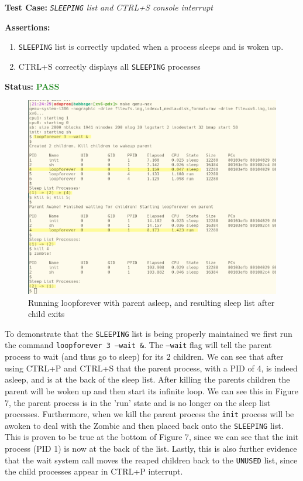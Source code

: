 \documentclass[11pt,letterpaper]{report}
\newcommand{\code}[1]{\colorbox{codegray}{\texttt{#1}}}
\begin{document}
{  \noindent\textbf{Test Case:} \emph{\code{SLEEPING} list and CTRL+S console interrupt}
  
  \noindent\textbf{Assertions:}
  \begin{enumerate}[]
  \item \code{SLEEPING} list is correctly updated when a process sleeps and is woken up.
  \item CTRL+S correctly displays all \code{SLEEPING} processes
  \end{enumerate}  
  
  \noindent\textbf{Status:} \textcolor{ForestGreen}{\textbf{PASS}}
  
  \begin{figure}[h!]
	\centering
	\includegraphics[width=1\linewidth]{sleeptest.png}
	\caption[img]{Running loopforever with parent asleep, and resulting sleep list after child exits}
	\label{fig:P1compileP0-1}
  \end{figure}

  To demonstrate that the \code{SLEEPING} list is being properly maintained we first run
  the command \code{loopforever 3 --wait \&}. The \code{--wait} flag will tell the 
  parent process to wait (and thus go to sleep) for its 2 children. We can see that 
  after using CTRL+P and CTRL+S that the parent process, with a PID of 4, is indeed asleep, and is at 
  the back of the sleep list. After killing the parents children the parent will be woken 
  up and then start its infinite loop. We can see this in Figure 7, the parent process is 
  in the 'run' state and is no longer on the sleep list processes. Furthermore, when we kill
  the parent process the \code{init} process will be awoken to deal with the Zombie and then
  placed back onto the \code{SLEEPING} list. This is proven to be true at the bottom of 
  Figure 7, since we can see that the init process (PID 1) is now at the back of the list. 
  Lastly, this is also further evidence that the wait system call moves the reaped children
  back to the \code{UNUSED} list, since the child processes appear in CTRL+P interrupt.

\ifdefined \LF
} %
\fi
\end{document}
